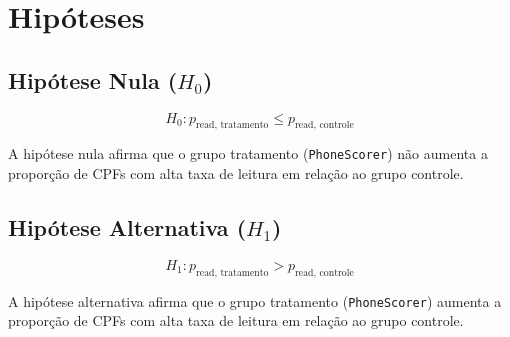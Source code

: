 \section{Hipóteses}

\subsection{Hipótese Nula ($H_0$)}

\[
H_0: p_{\text{read, tratamento}} \leq p_{\text{read, controle}}
\]

A hipótese nula afirma que o grupo tratamento (\texttt{PhoneScorer}) não aumenta a proporção de CPFs com alta taxa de leitura em relação ao grupo controle.

\vspace{0.3cm}

\subsection{Hipótese Alternativa ($H_1$)}

\[
H_1: p_{\text{read, tratamento}} > p_{\text{read, controle}}
\]

A hipótese alternativa afirma que o grupo tratamento (\texttt{PhoneScorer}) aumenta a proporção de CPFs com alta taxa de leitura em relação ao grupo controle.